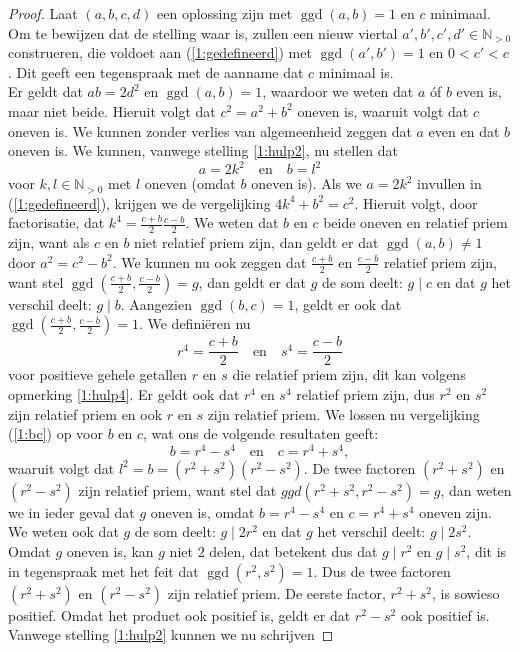 \documentclass[12pt,reqno]{article}
\newcommand*{\NO}{\ensuremath{\mathbb{N}_{>0}}}
\theoremstyle{theorem}
\theoremstyle{definition}
\DeclareMathOperator{\ggd}{ggd}
\begin{document}
\begin{proof}
		Laat $(a, b, c, d)$ een oplossing zijn met $\ggd(a,b) = 1$ en $c$ minimaal. Om te bewijzen dat de stelling waar is, zullen een nieuw viertal $a', b', c', d' \in\NO$ construeren, die voldoet aan (\ref{1:gedefineerd}) met $\ggd(a',b') = 1$ en $0 < c' < c$. Dit geeft een tegenspraak met de aanname dat $c$ minimaal is.\\
		
		Er geldt dat $ab = 2d^2$ en $\ggd(a,b)=1$, waardoor we weten dat $a$ \'of $b$ even is, maar niet beide. Hieruit volgt dat $c^2 = a^2 + b^2$ oneven is, waaruit volgt dat $c$ oneven is. We kunnen zonder verlies van algemeenheid zeggen dat $a$ even en dat $b$ oneven is. We kunnen, vanwege stelling \ref{1:hulp2}, nu stellen dat
		\begin{equation*}
			a = 2k^2 \quad \text{en} \quad b = l^2
		\end{equation*}
		voor $k,l\in\NO$ met $l$ oneven (omdat $b$ oneven is). Als we $a = 2k^2$ invullen in (\ref{1:gedefineerd}), krijgen we de vergelijking $4k^4 + b^2 = c^2$. Hieruit volgt, door factorisatie, dat $k^4 = \frac{c+b}{2}\frac{c-b}{2}$. We weten dat $b$ en $c$ beide oneven en relatief priem zijn, want als $c$ en $b$ niet relatief priem zijn, dan geldt er dat $\ggd(a,b)\neq1$ door $a^2 = c^2 - b^2$. We kunnen nu ook zeggen dat $\frac{c+b}{2}$ en $\frac{c-b}{2}$ relatief priem zijn, want stel $\ggd(\frac{c+b}{2},\frac{c-b}{2})=g$, dan geldt er dat $g$ de som deelt: $g \mid c$ en dat $g$ het verschil deelt: $g \mid b$. Aangezien $\ggd(b,c) = 1$, geldt er ook dat $\ggd(\frac{c+b}{2}, \frac{c-b}{2}) = 1$. We defini\"eren nu
		\begin{equation}\label{1:bc}
			r^4 = \frac{c+b}{2} \quad \text{en} \quad s^4 = \frac{c-b}{2}
		\end{equation}
		voor positieve gehele getallen $r$ en $s$ die relatief priem zijn, dit kan volgens opmerking \ref{1:hulp4}. Er geldt ook dat $r^4$ en $s^4$ relatief priem zijn, dus $r^2$ en $s^2$ zijn relatief priem en ook $r$ en $s$ zijn relatief priem. We lossen nu vergelijking (\ref{1:bc}) op voor $b$ en $c$, wat ons de volgende resultaten geeft:
		\begin{equation*}
			b = r^4 - s^4 \quad \text{en} \quad c = r^4 + s^4,
		\end{equation*}
		waaruit volgt dat $l^2 = b = (r^2 + s^2) (r^2 - s^2)$. De twee factoren $(r^2 + s^2)$ en $(r^2 - s^2)$ zijn relatief priem, want stel dat $ggd(r^2 + s^2, r^2 - s^2) = g$, dan weten we in ieder geval dat $g$ oneven is, omdat $b = r^4 - s^4$ en $c = r^4 + s^4$ oneven zijn. We weten ook dat $g$ de som deelt: $g \mid 2r^2$ en dat $g$ het verschil deelt: $g \mid 2s^2$. Omdat $g$ oneven is, kan $g$ niet $2$ delen, dat betekent dus dat $g \mid r^2$ en $g \mid s^2$, dit is in tegenspraak met het feit dat $\ggd(r^2, s^2) = 1$. Dus de twee factoren $(r^2 + s^2)$ en $(r^2 - s^2)$ zijn relatief priem. De eerste factor, $r^2 + s^2$, is sowieso positief. Omdat het product ook positief is, geldt er dat $r^2 - s^2$ ook positief is. Vanwege stelling \ref{1:hulp2} kunnen we nu schrijven 

\end{proof}
\end{document}
